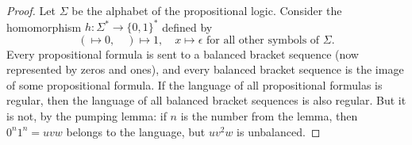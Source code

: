 \begin{proof}
Let $\Sigma$ be the alphabet of the propositional logic.
Consider the homomorphism $h \colon \Sigma^* \to \{0, 1\}^*$ defined by
\[
( \mapsto 0, \quad ) \mapsto 1, \quad x \mapsto \epsilon \text{ for all other symbols of }\Sigma.
\]
Every propositional formula is sent to a balanced bracket sequence (now represented by zeros and ones),
and every balanced bracket sequence is the image of some propositional formula.
If the language of all propositional formulas is regular, then the language of all balanced bracket sequences is also regular.
But it is not, by the pumping lemma: if $n$ is the number from the lemma, then $0^n1^n = uvw$ belongs to the language, but $uv^2w$ is unbalanced.
\end{proof}



